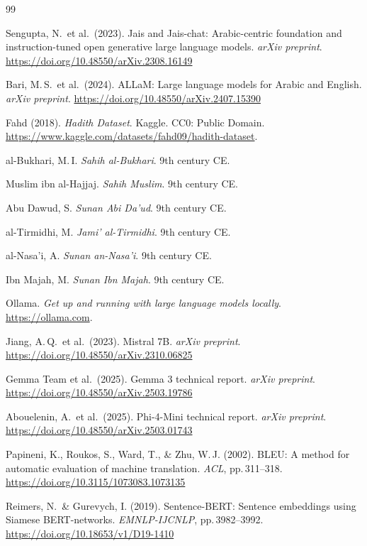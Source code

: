 \documentclass{article}
\begin{document}
\begin{thebibliography}{99}
\small

 Sengupta, N.\ et al.\ (2023). Jais and Jais-chat: Arabic-centric
foundation and instruction-tuned open generative large language models.
\emph{arXiv preprint}.
\url{https://doi.org/10.48550/arXiv.2308.16149}

 Bari, M.\,S.\ et al.\ (2024). ALLaM: Large language models for Arabic
and English. \emph{arXiv preprint}.
\url{https://doi.org/10.48550/arXiv.2407.15390}

 Fahd (2018). \emph{Hadith Dataset}. Kaggle. CC0: Public Domain.
\url{https://www.kaggle.com/datasets/fahd09/hadith-dataset}.

 al-Bukhari, M.\,I. \emph{Sahih al-Bukhari}. 9th century CE.

 Muslim ibn al-Hajjaj. \emph{Sahih Muslim}. 9th century CE.

 Abu Dawud, S. \emph{Sunan Abi Da'ud}. 9th century CE.

 al-Tirmidhi, M. \emph{Jami' al-Tirmidhi}. 9th century CE.

 al-Nasa'i, A. \emph{Sunan an-Nasa'i}. 9th century CE.

 Ibn Majah, M. \emph{Sunan Ibn Majah}. 9th century CE.

 Ollama. \emph{Get up and running with large language models locally}.
\url{https://ollama.com}.

 Jiang, A.\,Q.\ et al.\ (2023). Mistral 7B. \emph{arXiv preprint}.
\url{https://doi.org/10.48550/arXiv.2310.06825}

 Gemma Team et al.\ (2025). Gemma 3 technical report. \emph{arXiv
preprint}. \url{https://doi.org/10.48550/arXiv.2503.19786}

 Abouelenin, A.\ et al.\ (2025). Phi-4-Mini technical report.
\emph{arXiv preprint}. \url{https://doi.org/10.48550/arXiv.2503.01743}

 Papineni, K., Roukos, S., Ward, T., \& Zhu, W.\,J. (2002). BLEU: A method
for automatic evaluation of machine translation. \emph{ACL}, pp.\,311--318.
\url{https://doi.org/10.3115/1073083.1073135}

 Reimers, N.\ \& Gurevych, I. (2019). Sentence-BERT: Sentence embeddings
using Siamese BERT-networks. \emph{EMNLP-IJCNLP}, pp.\,3982--3992.
\url{https://doi.org/10.18653/v1/D19-1410}

\end{thebibliography}
\end{document}
